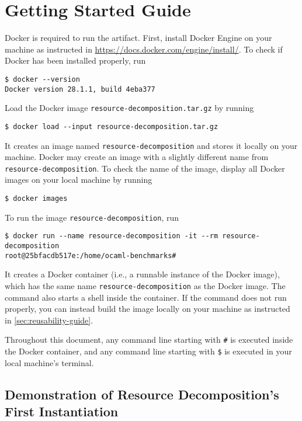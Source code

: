 
\section{Getting Started Guide}
\label{sec:getting-started-guide}

Docker is required to run the artifact.
%
First, install Docker Engine on your machine as instructed in
\url{https://docs.docker.com/engine/install/}.
%
To check if Docker has been installed properly, run
\begin{verbatim}
$ docker --version
Docker version 28.1.1, build 4eba377
\end{verbatim}

Load the Docker image \texttt{resource-decomposition.tar.gz} by running
\begin{verbatim}
$ docker load --input resource-decomposition.tar.gz
\end{verbatim}
%
It creates an image named \texttt{resource-decomposition} and stores it locally
on your machine.
%
Docker may create an image with a slightly different name from
\texttt{resource-decomposition}.
%
To check the name of the image, display all Docker images on your local machine
by running
\begin{verbatim}
$ docker images
\end{verbatim}

To run the image \texttt{resource-decomposition}, run
\begin{verbatim}
$ docker run --name resource-decomposition -it --rm resource-decomposition
root@25bfacdb517e:/home/ocaml-benchmarks#
\end{verbatim}
%
It creates a Docker container (i.e., a runnable instance of the Docker image),
which has the same name \texttt{resource-decomposition} as the Docker image.
%
The command also starts a shell inside the container.
%
If the command does not run properly, you can instead build the image locally on
your machine as instructed in \cref{sec:reusability-guide}.

Throughout this document, any command line starting with \texttt{\#} is executed
inside the Docker container, and any command line starting with \texttt{\$} is
executed in your local machine's terminal.

\subsection{Demonstration of Resource Decomposition's First Instantiation}

